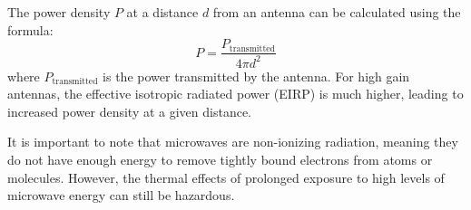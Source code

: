 The power density \( P \) at a distance \( d \) from an antenna can be calculated using the formula:
\[
P = \frac{P_{\text{transmitted}}}{4 \pi d^2}
\]
where \( P_{\text{transmitted}} \) is the power transmitted by the antenna. For high gain antennas, the effective isotropic radiated power (EIRP) is much higher, leading to increased power density at a given distance.

It is important to note that microwaves are non-ionizing radiation, meaning they do not have enough energy to remove tightly bound electrons from atoms or molecules. However, the thermal effects of prolonged exposure to high levels of microwave energy can still be hazardous.


